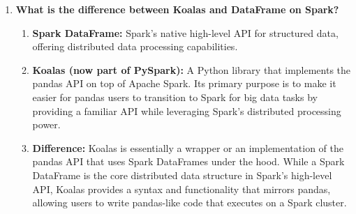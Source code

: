 \documentclass{article}
\begin{document}
\begin{enumerate}
    \item \textbf{What is the difference between Koalas and DataFrame on Spark?}
    \begin{enumerate}[label=\alph*)]
        \item \textbf{Spark DataFrame:} Spark's native high-level API for structured data, offering distributed data processing capabilities.
        \item \textbf{Koalas (now part of PySpark):} A Python library that implements the pandas API on top of Apache Spark. Its primary purpose is to make it easier for pandas users to transition to Spark for big data tasks by providing a familiar API while leveraging Spark's distributed processing power.
        \item \textbf{Difference:} Koalas is essentially a wrapper or an implementation of the pandas API that uses Spark DataFrames under the hood. While a Spark DataFrame is the core distributed data structure in Spark's high-level API, Koalas provides a syntax and functionality that mirrors pandas, allowing users to write pandas-like code that executes on a Spark cluster.
    \end{enumerate}
\end{enumerate}
\end{document}
